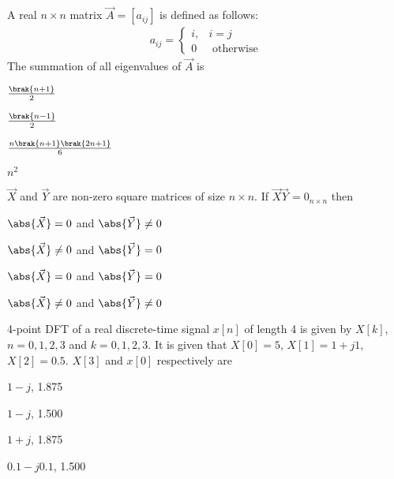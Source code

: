 \item A real $n \times n$ matrix $\vec{A} = [a_{ij}]$ is defined as follows:
\begin{align*}
    a_{ij}=
    \begin{cases}
	    i, &  i = j \\
	    0 & \text{ otherwise}
    \end{cases}
\end{align*}
The summation of all eigenvalues of $\vec{A}$ is
\hfill{}
\begin{enumerate}
\begin{multicols}{4}
\item $\frac{\brak{n+1}}{2}$
\item $\frac{\brak{n-1}}{2}$
\item $\frac{n\brak{n+1}\brak{2n+1}}{6}$
\item $n^2$
\end{multicols}
\end{enumerate}
%
\item $\vec{X}$ and $\vec{Y}$ are non-zero square matrices of size $n \times n$. If $\vec{X}\vec{Y}=0_{n \times n}$ then
\hfill{}\begin{enumerate} \begin{multicols}{2}
    \item $\abs{\vec{X}}=0$ and $\abs{\vec{Y}}\neq0$
    \item $\abs{\vec{X}}\neq0$ and $\abs{\vec{Y}}=0$
    \item $\abs{\vec{X}}=0$ and $\abs{\vec{Y}}=0$
    \item $\abs{\vec{X}}\neq0$ and $\abs{\vec{Y}}\neq0$
\end{multicols} \end{enumerate}


\item 4-point DFT of a real discrete-time signal $x[n]$ of length 4 is given by $X[k]$, $n=0,1,2,3$ and $k=0,1,2,3$. It is given that $X[0]=5$, $X[1]=1+j1$, $X[2]=0.5$. $X[3]$ and $x[0]$ respectively are
\hfill{}
\begin{enumerate} \begin{multicols}{4}
    \item $1-j$, 1.875
    \item $1-j$, 1.500
    \item $1+j$, 1.875
    \item $0.1-j0.1$, 1.500
\end{multicols} 
\end{enumerate}


